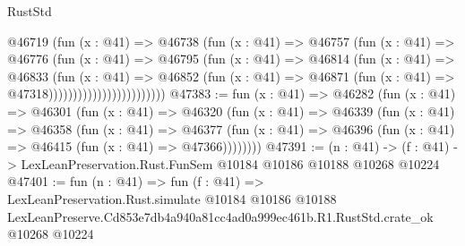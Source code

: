 \begin{lexlean}{RustStd}
\begin{coremodule}
                                @46719
                                  (fun (x : @41) =>
                                  @46738
                                    (fun (x : @41) =>
                                    @46757
                                      (fun (x : @41) =>
                                      @46776
                                        (fun (x : @41) =>
                                        @46795
                                          (fun (x : @41) =>
                                          @46814
                                            (fun (x : @41) =>
                                            @46833
                                              (fun (x : @41) =>
                                              @46852
                                                (fun (x : @41) =>
                                                @46871
                                                  (fun (x : @41) => @47318))))))))))))))))))))))))
@47383 := fun (x : @41) =>
  @46282
    (fun (x : @41) =>
    @46301
      (fun (x : @41) =>
      @46320
        (fun (x : @41) =>
        @46339
          (fun (x : @41) =>
          @46358
            (fun (x : @41) =>
            @46377
              (fun (x : @41) => @46396 (fun (x : @41) => @46415 (fun (x : @41) => @47366))))))))
@47391 := (n : @41) ->
  (f : @41) -> LexLeanPreservation.Rust.FunSem @10184 @10186 @10188 @10268 @10224
@47401 := fun (n : @41) =>
  fun (f : @41) =>
  LexLeanPreservation.Rust.simulate
    @10184
    @10186
    @10188
    LexLeanPreserve.Cd853e7db4a940a81cc4ad0a999ec461b.R1.RustStd.crate_ok
    @10268
    @10224
\end{coremodule}
\end{lexlean}
